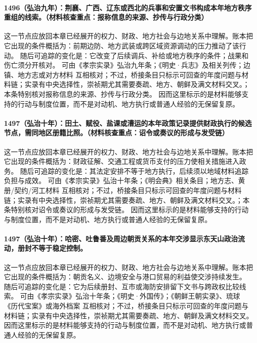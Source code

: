 \paragraph{1496（弘治九年）：荆襄、广西、辽东或西北的兵事和安置文书构成本年地方秩序重组的线索。（材料核查重点：报称信息的来源、抄传与行政分类）} 这一节点应放回本章已经展开的权力、财政、地方社会与边地关系中理解。账本把它出现的条件概括为：前期边防、地方武装或跨区域资源调动的压力推动了该行动。 随后可追踪的变化是：它改变了后续调兵、补给或地方秩序的条件；战果和伤亡须分开核对。 可由《孝宗实录》弘治九年条；《明史·兵志》及相关列传；边镇、地方志或对方材料 互相核对；不过，桥接条目只标示可回查的年度问题与材料链；实录有中央选择性，崇祯期尤其需要奏疏、地方、朝鲜及满文材料交叉。；本条特别核对报称信息的来源、抄传与行政分类。 因而这里标示的是材料能够支持的行动与制度位置，而不是对动机、地方执行或普通人经验的无保留复原。

\paragraph{1497（弘治十年）：田土、赋役、盐课或漕运的本年政策记录提供财政执行的候选节点，需同地区册籍比照。（材料核查重点：诏令或奏议的形成与发受链）} 这一节点应放回本章已经展开的权力、财政、地方社会与边地关系中理解。账本把它出现的条件概括为：财政征解、交通工程或货币支付的压力使相关措施进入政务。 随后可追踪的变化是：其法定安排不等于地方执行，后续须以地域材料追踪负担与成效。 可由《孝宗实录》弘治十年条；《明会典》相关条目；地方志、黄册/契约/河工材料 互相核对；不过，桥接条目只标示可回查的年度问题与材料链；实录有中央选择性，崇祯期尤其需要奏疏、地方、朝鲜及满文材料交叉。；本条特别核对诏令或奏议的形成与发受链。 因而这里标示的是材料能够支持的行动与制度位置，而不是对动机、地方执行或普通人经验的无保留复原。

\paragraph{1497（弘治十年）：哈密、吐鲁番及周边朝贡关系的本年交涉显示东天山政治流动，册封不等于稳定控制。} 这一节点应放回本章已经展开的权力、财政、地方社会与边地关系中理解。账本把它出现的条件概括为：朝贡名义、边境安全与港口贸易的利益使交涉持续发生。 随后可追踪的变化是：它为后续册封、互市或海防安排留下文书与跨政权比较线索。 可由《孝宗实录》弘治十年条；《明史·外国传》；《朝鲜王朝实录》、琉球《历代宝案》或海外档案 互相核对；不过，桥接条目只标示可回查的年度问题与材料链；实录有中央选择性，崇祯期尤其需要奏疏、地方、朝鲜及满文材料交叉。 因而这里标示的是材料能够支持的行动与制度位置，而不是对动机、地方执行或普通人经验的无保留复原。

